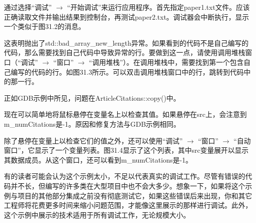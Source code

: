 通过选择“调试” $\rightarrow$ “开始调试”来运行应用程序。首先指定paper1.txt文件。应该正确读取文件并输出结果到控制台，再测试paper2.txt。调试器会中断执行，显示一个类似于图31.2的消息。


这表明抛出了std::bad\_array\_new\_length异常。如果看到的代码不是自己编写的代码，那么需要找到自己代码中导致异常的行。要做到这一点，请使用调用堆栈窗口（“调试” $\rightarrow$ “窗口” $\rightarrow$ “调用堆栈”）。在调用堆栈中，需要找到第一个包含自己编写的代码的行。如图31.3所示。可以双击调用堆栈窗口中的行，跳转到代码中的那一行。


正如GDB示例中所见，问题在ArticleCitations::copy()中。

现在可以简单地将鼠标悬停在变量名上以检查其值。如果悬停在src上，会注意到m\_numCitations是-1。原因和修复方法与GDB示例相同。

除了悬停在变量上以检查它们的值之外，还可以使用“调试” $\rightarrow$ “窗口” $\rightarrow$ “自动窗口”，它显示了一个变量列表。图31.4显示了这个列表，其中src变量展开以显示其数据成员。从这个窗口，还可以看到m\_numCitations是-1。



有的读者可能会认为这个示例太小，不足以代表真实的调试工作。尽管有错误的代码并不长，但编写的许多类在大型项目中也不会大多少。想象一下，如果将这个示例与项目的其他部分集成之前没有彻底测试它，如果这些错误后来出现，你和其它工程师将花费更多时间来缩小问题范围，才能像这里展示的那样进行调试。此外，这个示例中展示的技术适用于所有调试工作，无论规模大小。














